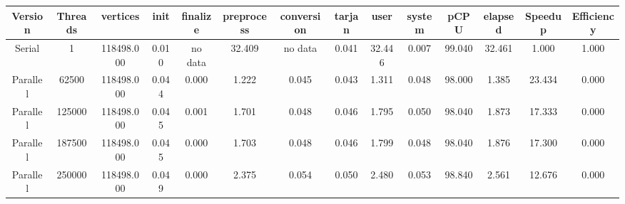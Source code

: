 \begin{tabular}{|c|c|c|c|c|c|c|c|c|c|c|c|c|c|}
\toprule
 Version &  Threads &   vertices &  init & finalize &  preprocess & conversion &  tarjan &   user &  system &   pCPU &  elapsed &  Speedup &  Efficiency \\
\midrule
  Serial &        1 & 118498.000 & 0.010 &  no data &      32.409 &    no data &   0.041 & 32.446 &   0.007 & 99.040 &   32.461 &    1.000 &       1.000 \\
Parallel &    62500 & 118498.000 & 0.044 &    0.000 &       1.222 &      0.045 &   0.043 &  1.311 &   0.048 & 98.000 &    1.385 &   23.434 &       0.000 \\
Parallel &   125000 & 118498.000 & 0.045 &    0.001 &       1.701 &      0.048 &   0.046 &  1.795 &   0.050 & 98.040 &    1.873 &   17.333 &       0.000 \\
Parallel &   187500 & 118498.000 & 0.045 &    0.000 &       1.703 &      0.048 &   0.046 &  1.799 &   0.048 & 98.040 &    1.876 &   17.300 &       0.000 \\
Parallel &   250000 & 118498.000 & 0.049 &    0.000 &       2.375 &      0.054 &   0.050 &  2.480 &   0.053 & 98.840 &    2.561 &   12.676 &       0.000 \\
\bottomrule
\end{tabular}
